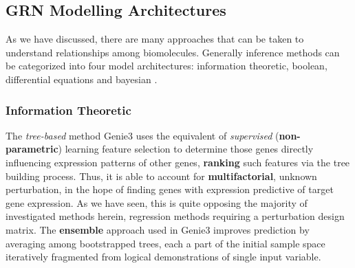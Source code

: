 \subsection{GRN Modelling Architectures}
\label{sec:models}
As we have discussed, there are many approaches that can be taken to understand relationships among biomolecules. Generally inference methods can be categorized into four model architectures: information theoretic, boolean, differential equations and bayesian \citep{HECKER200986}.
\subsubsection{Information Theoretic}
\label{sec:info}
The \emph{tree-based} method Genie3 \citep{irrthum2010inferring} uses the equivalent of \emph{supervised} (\textbf{non-parametric}) learning feature selection to determine those genes directly influencing expression patterns of other genes, \textbf{ranking} such features via the tree building process. Thus, it is able to account for \textbf{multifactorial}, \ie unknown perturbation, in the hope of finding genes with expression predictive of target gene expression. As we have seen, this is quite opposing the majority of investigated methods herein, regression methods requiring a perturbation design matrix. The \textbf{ensemble} approach used in Genie3 improves prediction by averaging among bootstrapped trees, each a part of the initial sample space iteratively fragmented from logical demonstrations of single input variable.



